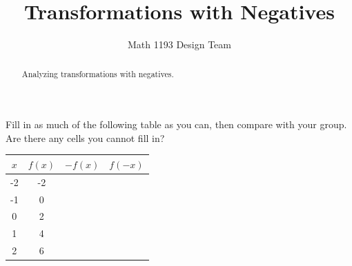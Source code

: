 \documentclass[noauthor]{ximera}
\title{Transformations with Negatives}
\author{Math 1193 Design Team}
\begin{document}
\begin{abstract}
    Analyzing transformations with negatives.
\end{abstract}
\maketitle

Fill in as much of the following table as you can, then 
compare with your group. Are there any cells you cannot fill in?

\begin{center}
\begin{tabular}{|c|c|c|c|} 
 \hline
 \(x\) & \(f(x)\) & \(-f(x)\) & \(f(-x)\) \\
 \hline\hline
 -2 & -2 &  &  \\ 
 \hline
 -1 & 0 &  &  \\
 \hline
 0 & 2 &  &  \\
 \hline
 1 & 4 &  &  \\
 \hline
 2 & 6 &  &  \\
 \hline
\end{tabular}
\end{center}
\end{document}
